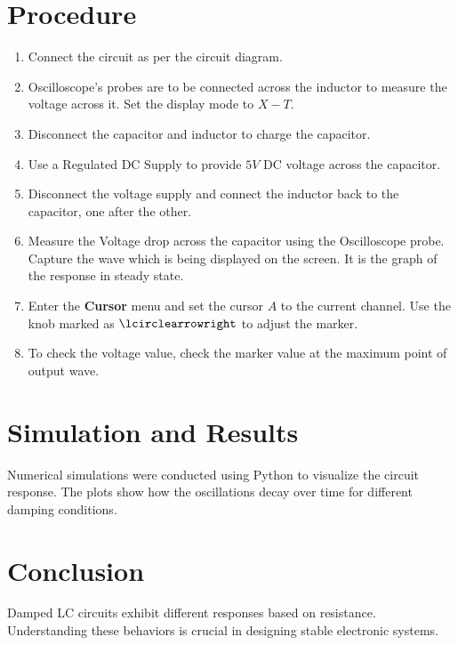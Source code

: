 \documentclass[a4paper,12pt]{article}
\begin{document}
\section{Procedure}
\begin{enumerate}
    \item Connect the circuit as per the circuit diagram.
    \item Oscilloscope's probes are to be connected across the inductor to measure the voltage across it. Set the display mode to $X - T$.
    \item Disconnect the capacitor and inductor to charge the capacitor.
    \item Use a Regulated DC Supply to provide $5 V$ DC voltage across the capacitor.
    \item Disconnect the voltage supply and connect the inductor back to the capacitor, one after the other. 
    \item Measure the Voltage drop across the capacitor using the Oscilloscope probe. Capture the wave which is being displayed on the screen. It is the graph of the response in steady state.
    \item Enter the \textbf{Cursor} menu and set the cursor $A$ to the current channel. Use the knob marked as $\lcirclearrowright$ to adjust the marker.
    \item To check the voltage value, check the marker value at the maximum point of output wave.
\end{enumerate}

\section{Simulation and Results}
Numerical simulations were conducted using Python to visualize the circuit response. The plots show how the oscillations decay over time for different damping conditions.

\section{Conclusion}
Damped LC circuits exhibit different responses based on resistance. Understanding these behaviors is crucial in designing stable electronic systems.
\end{document}
